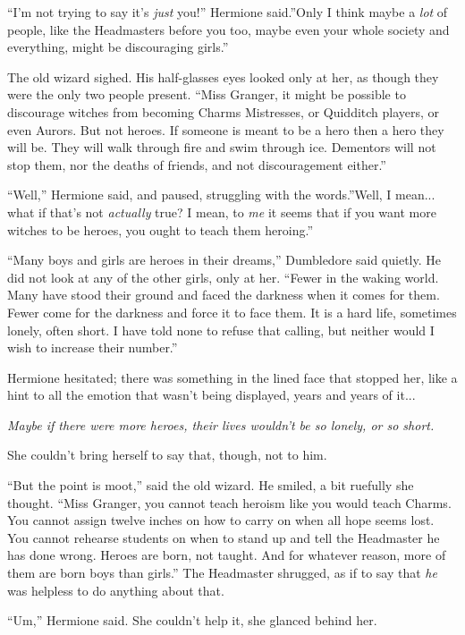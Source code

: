 ``I'm not trying to say it's \emph{just} you!'' Hermione said.''Only I
think maybe a \emph{lot} of people, like the Headmasters before you too,
maybe even your whole society and everything, might be discouraging
girls.''

The old wizard sighed. His half-glasses eyes looked only at her, as
though they were the only two people present. ``Miss Granger, it might
be possible to discourage witches from becoming Charms Mistresses, or
Quidditch players, or even Aurors. But not heroes. If someone is meant
to be a hero then a hero they will be. They will walk through fire and
swim through ice. Dementors will not stop them, nor the deaths of
friends, and not discouragement either.''

``Well,'' Hermione said, and paused, struggling with the words.''Well, I
mean... what if that's not \emph{actually} true? I mean, to
\emph{me} it seems that if you want more witches to be heroes, you ought
to teach them heroing.''

``Many boys and girls are heroes in their dreams,'' Dumbledore said
quietly. He did not look at any of the other girls, only at her. ``Fewer
in the waking world. Many have stood their ground and faced the darkness
when it comes for them. Fewer come for the darkness and force it to face
them. It is a hard life, sometimes lonely, often short. I have told none
to refuse that calling, but neither would I wish to increase their
number.''

Hermione hesitated; there was something in the lined face that stopped
her, like a hint to all the emotion that wasn't being displayed, years
and years of it...

\emph{Maybe if there were more heroes, their lives wouldn't be so
lonely, or so short.}

She couldn't bring herself to say that, though, not to him.

``But the point is moot,'' said the old wizard. He smiled, a bit
ruefully she thought. ``Miss Granger, you cannot teach heroism like you
would teach Charms. You cannot assign twelve inches on how to carry on
when all hope seems lost. You cannot rehearse students on when to stand
up and tell the Headmaster he has done wrong. Heroes are born, not
taught. And for whatever reason, more of them are born boys than
girls.'' The Headmaster shrugged, as if to say that \emph{he} was
helpless to do anything about that.

``Um,'' Hermione said. She couldn't help it, she glanced behind her.

